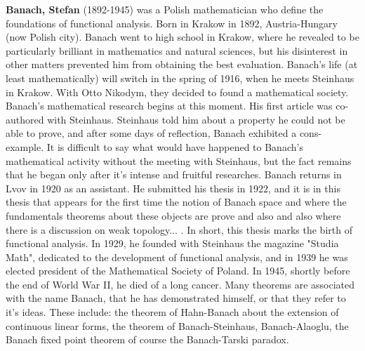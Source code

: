 \textbf{Banach, Stefan} (1892-1945) was a Polish mathematician who define the foundations of functional analysis. Born in Krakow in 1892, Austria-Hungary (now Polish city). Banach went to high school in Krakow, where he revealed to be particularly brilliant in mathematics and natural sciences, but his disinterest in other matters prevented him from obtaining the best evaluation. Banach's life (at least mathematically) will switch in the spring of 1916, when he meets Steinhaus in Krakow. With Otto Nikodym, they decided to found a mathematical society. Banach's mathematical research begins at this moment. His first article was co-authored with Steinhaus. Steinhaus told him about a property he could not be able to prove, and after some days of reflection, Banach exhibited a cons-example. It is difficult to say what would have happened to Banach's mathematical activity without the meeting with Steinhaus, but the fact remains that he began only after it's intense and fruitful researches. Banach returns in Lvov in 1920 as an assistant. He submitted his thesis in 1922, and it is in this thesis that appears for the first time the notion of Banach space and where the fundamentals theorems about these objects are prove and also and also where there is a discussion on weak topology... . In short, this thesis marks the birth of functional analysis. In 1929, he founded with Steinhaus the magazine "Studia Math", dedicated to the development of functional analysis, and in 1939 he was elected president of the Mathematical Society of Poland. In 1945, shortly before the end of World War II, he died of a long cancer. Many theorems are associated with the name Banach, that he has demonstrated himself, or that they refer to it's ideas. These include: the theorem of Hahn-Banach about the extension of continuous linear forms, the theorem of Banach-Steinhaus, Banach-Alaoglu, the Banach fixed point theorem of course the Banach-Tarski paradox.

